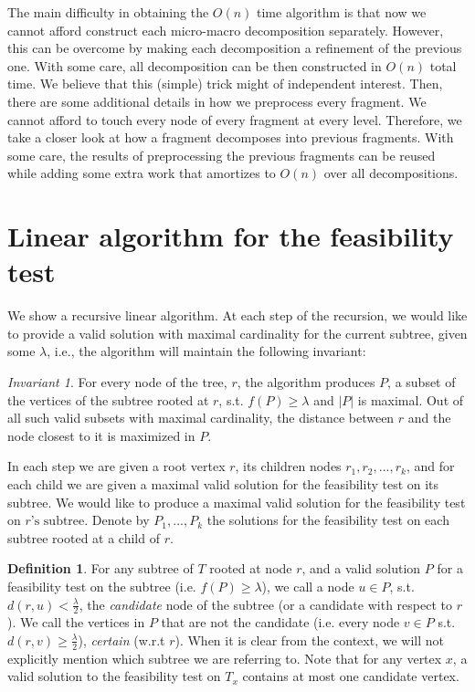 \documentclass[11pt,a4paper]{article}
\newtheorem{algo}{Algorithm}[section]
\theoremstyle{definition}
\newtheorem{definition}{Definition}
\theoremstyle{remark}
\newtheorem{invariant}{Invariant}
\begin{document}
The main difficulty in obtaining the $O(n)$ time algorithm is that now we cannot afford construct each
micro-macro decomposition separately. However, this can be overcome by making each decomposition
a refinement of the previous one. With some care, all decomposition can be then constructed in
$O(n)$ total time. We believe that this (simple) trick might of independent interest. Then, there
are some additional details in how we preprocess every fragment. We cannot afford to touch
every node of every fragment at every level. Therefore, we take a closer look at how a fragment
decomposes into previous fragments. With some care, the results of preprocessing the previous
fragments can be reused while adding some extra work that amortizes to $O(n)$ over all decompositions.

\section{Linear algorithm for the feasibility test}\label{linear F.T.}
We show a recursive linear algorithm. At each step of the recursion, we would like to provide a valid solution with maximal cardinality for the current subtree, given some $\lambda$, i.e., the algorithm will maintain the following invariant:
\begin{invariant}\label{Maximality of P and distance of closest node invariant}
For every node of the tree, $r$, the algorithm produces $P$, a subset of the vertices of the subtree rooted at $r$, s.t. $f(P)\geq\lambda$ and $|P|$ is maximal. Out of all such valid subsets with maximal cardinality, the distance between $r$ and the node closest to it is maximized in $P$.
\end{invariant}
In each step we are given a root vertex $r$, its children nodes $r_{1},r_{2},...,r_{k}$, and for each child we are given a maximal valid solution for the feasibility test on its subtree. We would like to produce a maximal valid solution for the feasibility test on $r\text{'s subtree}$.
Denote by $P_{1},...,P_{k}$ the solutions for the feasibility test on each subtree rooted at a child of $r$.
\begin{definition}
For any subtree of $T$ rooted at node $r$, and a valid solution $P$ for a feasibility test on the subtree (i.e. $f(P)\geq\lambda$), we call a node $u\in P$, s.t. $d(r,u)<\frac{\lambda}{2}$, the \emph{candidate} node of the subtree (or a candidate with respect to $r$). We call the vertices in $P$ that are not the candidate (i.e. every node $v \in P$ s.t. $d(r,v)\geq \frac{\lambda}{2}$), \emph{certain} (w.r.t $r$). When it is clear from the context, we will not explicitly mention which subtree we are referring to.
Note that for any vertex $x$, a valid solution to the feasibility test on $T_x$ contains at most one candidate vertex.
\end{definition}
\end{document}
